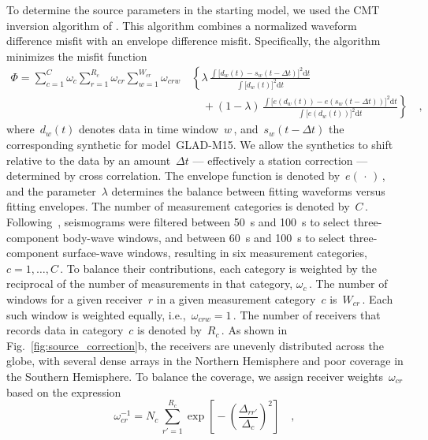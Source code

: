 \documentclass[extra,mreferee]{gji}
\begin{document}
To determine the source parameters in the starting model,
we used the CMT inversion algorithm of \cite{liu2004spectral}.
This algorithm combines a normalized waveform difference misfit with an envelope difference misfit.
Specifically, the algorithm minimizes the misfit function
\begin{equation}
   \begin{split}
      \Phi =  \sum\limits_{c=1}^{C} \omega_c \sum\limits_{r=1}^{R_c} \omega_{cr}
       \sum\limits_{w=1}^{W_{cr}} \omega_{crw}\,
          & \left\{ \lambda\, \frac
              { \int \big[ d_w(t) - s_w(t - \Delta t) \big]^2 \mathrm{d}t}
              {\int \big[ d_w(t) \big]^2  \mathrm{d}t} \right.
       \\ & \quad \left. \mbox{} + (1 - \lambda)\, \frac
              {\int \big[ e(d_w(t)) - e(s_w(t - \Delta t)) \big]^2 \mathrm{d}t}
              {\int \big[ e(d_w(t)) \big]^2\mathrm{d}t} \right\}
              \quad ,
   \end{split}
\end{equation}
where~$d_w(t)$ denotes data in time window~$w$\,,
and~$s_w(t - \Delta t)$ the corresponding synthetic for model~GLAD-M15.
We allow the synthetics to shift relative to the data by an amount~$\Delta t$
--- effectively a station correction --- determined by cross correlation.
The envelope function is denoted by~$e(\,\cdot\,)$\,,
and the parameter~$\lambda$ determines the balance between fitting waveforms versus fitting envelopes.
The number of measurement categories is denoted by~$C$\,.
Following~\cite{ekstrom2012global},
seismograms were filtered between 50~s and 100~s
to select three-component body-wave windows,
and between 60~s and 100~s to select three-component
surface-wave windows,
resulting in six measurement categories, $c=1,\ldots,C$\,.
To balance their contributions,
each category is weighted by the reciprocal of the number of measurements in that
category, $\omega_c$\,.
The number of windows for a given receiver~$r$ in a given measurement category~$c$ is~$W_{cr}$\,.
Each such window is weighted equally, i.e.,~$\omega_{crw}=1$\,.
The number of receivers that records data in category~$c$ is denoted by~$R_c$\,.
As shown in Fig.~\ref{fig:source_correction}b,
the receivers are unevenly distributed across the globe,
with several dense arrays in the Northern Hemisphere and poor coverage in the Southern Hemisphere.
To balance the coverage,
we assign receiver weights~$\omega_{cr}$ based on the expression
\begin{equation}
\omega_{cr}^{-1} = N_c\,\sum_{r'=1}^{R_c} \exp\left[\mbox{}-\left(\frac{\Delta_{rr'}}{\Delta_c}\right)^2\right]
\quad ,
\label{eq:spatial_weights}
\end{equation}
\end{document}
